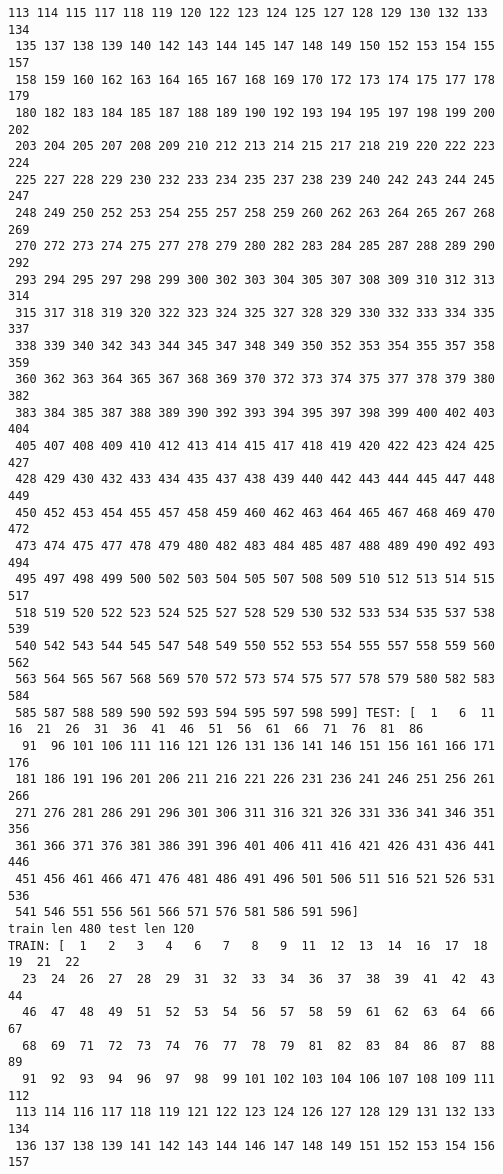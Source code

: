 \documentclass[11pt]{article}
\begin{document}
\begin{Verbatim}[commandchars=\\\{\}]
 113 114 115 117 118 119 120 122 123 124 125 127 128 129 130 132 133 134
 135 137 138 139 140 142 143 144 145 147 148 149 150 152 153 154 155 157
 158 159 160 162 163 164 165 167 168 169 170 172 173 174 175 177 178 179
 180 182 183 184 185 187 188 189 190 192 193 194 195 197 198 199 200 202
 203 204 205 207 208 209 210 212 213 214 215 217 218 219 220 222 223 224
 225 227 228 229 230 232 233 234 235 237 238 239 240 242 243 244 245 247
 248 249 250 252 253 254 255 257 258 259 260 262 263 264 265 267 268 269
 270 272 273 274 275 277 278 279 280 282 283 284 285 287 288 289 290 292
 293 294 295 297 298 299 300 302 303 304 305 307 308 309 310 312 313 314
 315 317 318 319 320 322 323 324 325 327 328 329 330 332 333 334 335 337
 338 339 340 342 343 344 345 347 348 349 350 352 353 354 355 357 358 359
 360 362 363 364 365 367 368 369 370 372 373 374 375 377 378 379 380 382
 383 384 385 387 388 389 390 392 393 394 395 397 398 399 400 402 403 404
 405 407 408 409 410 412 413 414 415 417 418 419 420 422 423 424 425 427
 428 429 430 432 433 434 435 437 438 439 440 442 443 444 445 447 448 449
 450 452 453 454 455 457 458 459 460 462 463 464 465 467 468 469 470 472
 473 474 475 477 478 479 480 482 483 484 485 487 488 489 490 492 493 494
 495 497 498 499 500 502 503 504 505 507 508 509 510 512 513 514 515 517
 518 519 520 522 523 524 525 527 528 529 530 532 533 534 535 537 538 539
 540 542 543 544 545 547 548 549 550 552 553 554 555 557 558 559 560 562
 563 564 565 567 568 569 570 572 573 574 575 577 578 579 580 582 583 584
 585 587 588 589 590 592 593 594 595 597 598 599] TEST: [  1   6  11  16  21  26  31  36  41  46  51  56  61  66  71  76  81  86
  91  96 101 106 111 116 121 126 131 136 141 146 151 156 161 166 171 176
 181 186 191 196 201 206 211 216 221 226 231 236 241 246 251 256 261 266
 271 276 281 286 291 296 301 306 311 316 321 326 331 336 341 346 351 356
 361 366 371 376 381 386 391 396 401 406 411 416 421 426 431 436 441 446
 451 456 461 466 471 476 481 486 491 496 501 506 511 516 521 526 531 536
 541 546 551 556 561 566 571 576 581 586 591 596]
train len 480 test len 120
TRAIN: [  1   2   3   4   6   7   8   9  11  12  13  14  16  17  18  19  21  22
  23  24  26  27  28  29  31  32  33  34  36  37  38  39  41  42  43  44
  46  47  48  49  51  52  53  54  56  57  58  59  61  62  63  64  66  67
  68  69  71  72  73  74  76  77  78  79  81  82  83  84  86  87  88  89
  91  92  93  94  96  97  98  99 101 102 103 104 106 107 108 109 111 112
 113 114 116 117 118 119 121 122 123 124 126 127 128 129 131 132 133 134
 136 137 138 139 141 142 143 144 146 147 148 149 151 152 153 154 156 157

\end{Verbatim}
\end{document}
